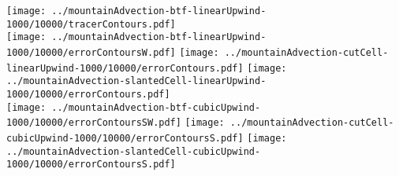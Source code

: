 \documentclass{article}
\begin{document}
\texttt{[image: ../mountainAdvection-btf-linearUpwind-1000/10000/tracerContours.pdf]}
\vspace*{1em} \\
\texttt{[image: ../mountainAdvection-btf-linearUpwind-1000/10000/errorContoursW.pdf]}
\texttt{[image: ../mountainAdvection-cutCell-linearUpwind-1000/10000/errorContours.pdf]}
\texttt{[image: ../mountainAdvection-slantedCell-linearUpwind-1000/10000/errorContours.pdf]} \\
\texttt{[image: ../mountainAdvection-btf-cubicUpwind-1000/10000/errorContoursSW.pdf]}
\texttt{[image: ../mountainAdvection-cutCell-cubicUpwind-1000/10000/errorContoursS.pdf]}
\texttt{[image: ../mountainAdvection-slantedCell-cubicUpwind-1000/10000/errorContoursS.pdf]}
\end{document}
